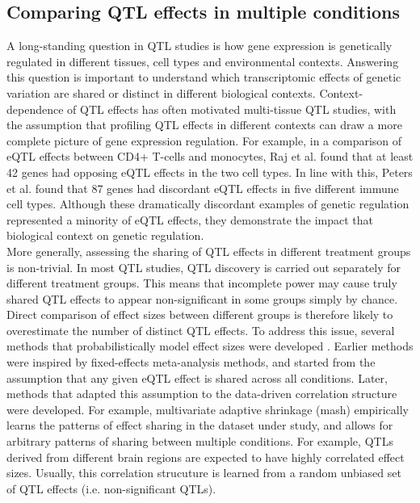 \subsection{Comparing QTL effects in multiple conditions}
A long-standing question in QTL studies is how gene expression is genetically regulated in different tissues, cell types and environmental contexts. Answering this question is important to understand which transcriptomic effects of genetic variation are shared or distinct in different biological contexts. Context-dependence of QTL effects has often motivated multi-tissue QTL studies, with the assumption that profiling QTL effects in different contexts can draw a more complete picture of gene expression regulation. For example, in a comparison of eQTL effects between CD4+ T-cells and monocytes, Raj et al. \cite{Raj2014-xw} found that at least 42 genes had opposing eQTL effects in the two cell types. In line with this, Peters et al. \cite{Peters2016-zk} found that 87 genes had discordant eQTL effects in five different immune cell types. Although these dramatically discordant examples of genetic regulation represented a minority of eQTL effects, they demonstrate the impact that biological context on genetic regulation.\\

More generally, assessing the sharing of QTL effects in different treatment groups is non-trivial. In most QTL studies, QTL discovery is carried out separately for different treatment groups. This means that incomplete power may cause truly shared QTL effects to appear non-significant in some groups simply by chance. Direct comparison of effect sizes between different groups is therefore likely to overestimate the number of distinct QTL effects. To address this issue, several methods that probabilistically model effect sizes were developed \cite{Flutre2013-sp,Li2018-kr,Sul2013-xm, Urbut2019-gf}. Earlier methods were inspired by fixed-effects meta-analysis methods, and started from the assumption that any given eQTL effect is shared across all conditions. Later, methods that adapted this assumption to the data-driven correlation structure were developed. For example, multivariate adaptive shrinkage (mash) empirically learns the patterns of effect sharing in the dataset under study, and allows for arbitrary patterns of sharing between multiple conditions. For example, QTLs derived from different brain regions are expected to have highly correlated effect sizes. Usually, this correlation strucuture is learned from a random unbiased set of QTL effects (i.e. non-significant QTLs).\\

